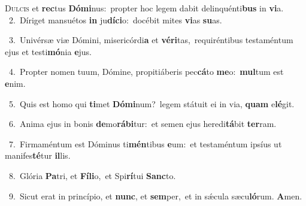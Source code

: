 \lettrine{\initial\textcolor{\initialcolor}{D}}{ulcis} et \textbf{rec}\-tus \textbf{Dó}\-\textbf{mi}nus:~\star propter hoc legem dabit delinquénti\textbf{bus} in \textbf{vi}\-a.\\
{\numbfont\textcolor{\numbcolor}{~2.}}~Díriget mansuétos \textbf{in} ju\-\textbf{dí}\-\textbf{ci}o:~\star docébit mites \textbf{vi}\-as \textbf{su}\-as.\par
{\numbfont\textcolor{\numbcolor}{~3.}}~Univérsæ viæ Dómini, misericórdi\textbf{a} et \textbf{vé}\-\textbf{ri}tas,~\star requiréntibus testaméntum ejus et testi\-\textbf{mó}\-nia \textbf{e}\-jus.\par
{\numbfont\textcolor{\numbcolor}{~4.}}~Propter nomen tuum, Dómine, propitiáberis pec\-\textbf{cá}\-to \textbf{me}\-o:~\star \textbf{mul}\-tum est \textbf{e}\-nim.\par
{\numbfont\textcolor{\numbcolor}{~5.}}~Quis est homo qui \textbf{ti}\-met \textbf{Dó}\-\textbf{mi}num?~\star legem státuit ei in via, \textbf{quam} e\-\textbf{lé}\-git.\par
{\numbfont\textcolor{\numbcolor}{~6.}}~Anima ejus in bonis \textbf{de}\-mo\-\textbf{rá}\-\textbf{bi}tur:~\star et semen ejus heredi\-\textbf{tá}\-bit \textbf{ter}\-ram.\par
{\numbfont\textcolor{\numbcolor}{~7.}}~Firmaméntum est Dóminus ti\-\textbf{mén}\-tibus \textbf{e}\-um:~\star et testaméntum ipsíus ut manifes\-\textbf{té}\-tur \textbf{il}\-lis.\par
{\numbfont\textcolor{\numbcolor}{~8.}}~Glória \textbf{Pa}\-tri, et \textbf{Fí}\-\textbf{li}o,~\star et Spi\-\textbf{rí}\-tui \textbf{Sanc}\-to.\par
{\numbfont\textcolor{\numbcolor}{~9.}}~Sicut erat in princípio, et \textbf{nunc}\-, et \textbf{sem}\-per,~\star et in sǽcula sæcu\-\textbf{ló}\-rum. \textbf{A}\-men.\par

